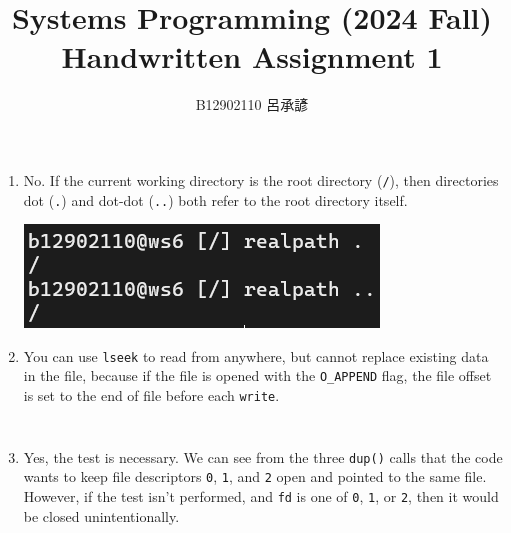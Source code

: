 \documentclass[12pt, a4paper]{article}
\title{
  \vspace{-1cm}
  Systems Programming (2024 Fall)\\
  Handwritten Assignment 1
}
\author{\Large B12902110 呂承諺}
\date{}
\begin{document}
  \maketitle
  \begin{enumerate}
    \item No. If the current working directory is the root directory (\texttt{/}),
    then directories dot (\texttt{.}) and dot-dot (\texttt{..}) both refer to
    the root directory itself.

    \includegraphics[width=0.4\linewidth]{1_realpath.png}

    \item You can use \verb|lseek| to read from anywhere, but cannot replace existing
    data in the file, because if the file is opened with the \verb|O_APPEND| flag, the
    file offset is set to the end of file before each \verb|write|.

    \inputminted[label=\footnotesize2\_append.c]{c}{2_append.c}
    \inputminted[label=\footnotesize2\_append.txt]{text}{2_append.txt}

    \item Yes, the test is necessary. We can see from the three \verb|dup()| calls that
    the code wants to keep file descriptors \verb|0|, \verb|1|, and \verb|2| open and pointed
    to the same file. However, if the test isn't performed, and \verb|fd| is one of \verb|0|,
    \verb|1|, or \verb|2|, then it would be closed unintentionally.
  \end{enumerate}
\end{document}
